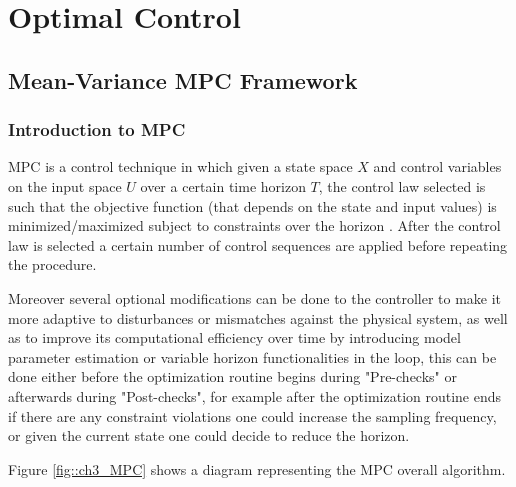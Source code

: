 \chapter{Optimal Control}
\label{ch3}

\singlespacing %
\minitoc %
\doublespacing %

\section{Mean-Variance MPC Framework}

\subsection{Introduction to MPC}

\ac{MPC} is a control technique in which given a state space $X$ and control variables on the input space $U$ over a certain time horizon $T$, the control law selected is such that the objective function (that depends on the state and input values) is minimized/maximized subject to constraints over the horizon \cite{PredictiveControl}. After the control law is selected a certain number of control sequences are applied before repeating the procedure.

Moreover several optional modifications can be done to the controller to make it more adaptive to disturbances or  mismatches against the physical system, as well as to improve its computational efficiency over time by introducing  model parameter estimation or variable horizon functionalities in the loop, this can be done either before the optimization routine begins during "Pre-checks" or afterwards during "Post-checks", for example after the optimization routine ends if there are any constraint violations one could increase the sampling frequency, or given the current state one could decide to reduce the horizon. 

Figure \ref{fig::ch3_MPC} shows a diagram representing the MPC overall algorithm.

